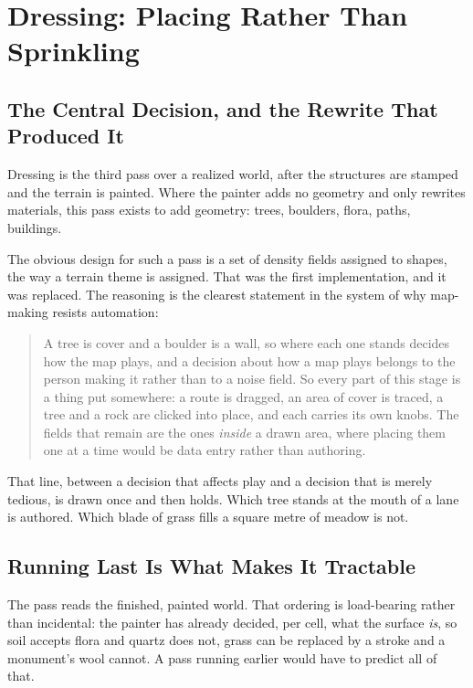 \chapter{Dressing: Placing Rather Than Sprinkling}
\label{ch:dressing}

\section{The Central Decision, and the Rewrite That Produced It}

Dressing is the third pass over a realized world, after the structures are stamped
and the terrain is painted. Where the painter adds no geometry and only rewrites
materials, this pass exists to add geometry: trees, boulders, flora, paths,
buildings.

The obvious design for such a pass is a set of density fields assigned to shapes,
the way a terrain theme is assigned. That was the first implementation, and it was
replaced. The reasoning is the clearest statement in the system of why map-making
resists automation:

\begin{quote}
A tree is cover and a boulder is a wall, so where each one stands decides how the
map plays, and a decision about how a map plays belongs to the person making it
rather than to a noise field. So every part of this stage is a thing put somewhere:
a route is dragged, an area of cover is traced, a tree and a rock are clicked into
place, and each carries its own knobs. The fields that remain are the ones
\emph{inside} a drawn area, where placing them one at a time would be data entry
rather than authoring.
\end{quote}

That line, between a decision that affects play and a decision that is merely
tedious, is drawn once and then holds. Which tree stands at the mouth of a lane is
authored. Which blade of grass fills a square metre of meadow is not.

\section{Running Last Is What Makes It Tractable}

The pass reads the finished, painted world. That ordering is load-bearing rather
than incidental: the painter has already decided, per cell, what the surface
\emph{is}, so soil accepts flora and quartz does not, grass can be replaced by a
stroke and a monument's wool cannot. A pass running earlier would have to predict
all of that.

